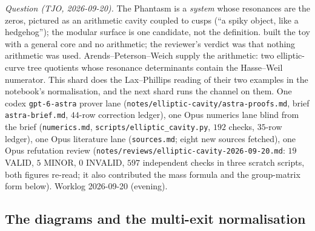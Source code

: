 \emph{Question (TJO, 2026-09-20).} The Phantasm is a \emph{system} whose resonances are the zeros, pictured
as an arithmetic cavity coupled to cusps (``a spiky object, like a hedgehog''); the modular surface is one
candidate, not the definition.  built the toy with a
general core and no arithmetic; the reviewer's verdict was that nothing arithmetic was used. Arends--Peterson--Weich
\cite{arends2026resonances} supply the arithmetic: two elliptic-curve tree quotients whose resonance
determinants contain the Hasse--Weil numerator. This shard does the Lax--Phillips reading of their two
examples in the notebook's normalisation, and the next shard runs the channel on them. One codex
\texttt{gpt-6-astra} prover lane (\texttt{notes/elliptic-cavity/astra-proofs.md}, brief \texttt{astra-brief.md},
$44$-row correction ledger), one Opus numerics lane blind from the brief (\texttt{numerics.md},
\texttt{scripts/elliptic\_cavity.py}, $192$ checks, $35$-row ledger), one Opus literature lane
(\texttt{sources.md}; eight new sources fetched), one Opus refutation review
(\texttt{notes/reviews/elliptic-cavity-2026-09-20.md}: $19$ VALID, $5$ MINOR, $0$ INVALID, $597$ independent checks in three
scratch scripts, both figures re-read; it also contributed the mass formula and the group-matrix form below). Worklog
2026-09-20 (evening).

\subsection{The diagrams and the multi-exit normalisation}

